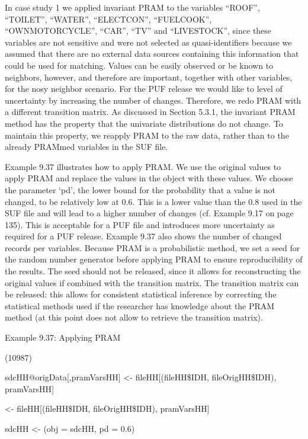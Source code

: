 \documentclass[letterpaper,10pt,english]{sphinxmanual}
\begin{document}
In case study 1 we applied invariant PRAM to the variables “ROOF”,
“TOILET”, “WATER”, “ELECTCON”, “FUELCOOK”, “OWNMOTORCYCLE”, “CAR”, “TV”
and “LIVESTOCK”, since these variables are not sensitive and were not
selected as quasi-identifiers because we assumed that there are no
external data sources containing this information that could be used for
matching. Values can be easily observed or be known to neighbors,
however, and therefore are important, together with other variables, for
the nosy neighbor scenario. For the PUF release we would like to level
of uncertainty by increasing the number of changes. Therefore, we redo
PRAM with a different transition matrix. As discussed in Section 5.3.1,
the invariant PRAM method has the property that the univariate
distributions do not change. To maintain this property, we reapply PRAM
to the raw data, rather than to the already PRAMmed variables in the SUF
file.

Example 9.37 illustrates how to apply PRAM. We use the original values
to apply PRAM and replace the values in the  object with these
values. We choose the parameter ‘pd’, the lower bound for the
probability that a value is not changed, to be relatively low at 0.6.
This is a lower value than the 0.8 used in the SUF file and will lead to
a higher number of changes (cf. Example 9.17 on page 135). This is
acceptable for a PUF file and introduces more uncertainty as required
for a PUF release. Example 9.37 also shows the number of changed records
per variables. Because PRAM is a probabilistic method, we set a seed for
the random number generator before applying PRAM to ensure
reproducibility of the results.  The seed should
not be released, since it allows for reconstructing the original values
if combined with the transition matrix. The transition matrix can be
released: this allows for consistent statistical inference by correcting
the statistical methods used if the researcher has knowledge about the
PRAM method (at this point  does not allow to retrieve the
transition matrix).

Example 9.37: Applying PRAM

\begin{DUlineblock}{0em}
\item[] 
\item[] (10987)
\item[] 
\item[] sdcHH@origData{[},pramVarsHH{]} \textless{}- fileHH{[}(fileHH\$IDH,
fileOrigHH\$IDH), pramVarsHH{]}
\item[]  \textless{}- fileHH{[}(fileHH\$IDH,
fileOrigHH\$IDH), pramVarsHH{]}
\item[] sdcHH \textless{}- (obj = sdcHH, pd = 0.6)
\end{DUlineblock}
\end{document}
